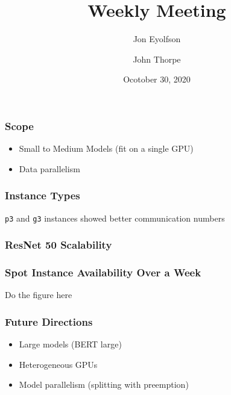 

\title{Weekly Meeting}
\date{Ocotober 30, 2020}
\author{Jon Eyolfson \and John Thorpe}



  \begin{frame}[plain]
    \titlepage
  \end{frame}

  \setcounter{framenumber}{0}

  \begin{frame}
    \frametitle{Scope}

    \begin{itemize}
      \item Small to Medium Models (fit on a single GPU)
      \item Data parallelism
    \end{itemize}
  \end{frame}

  \begin{frame}
    \frametitle{Instance Types}

    \texttt{p3} and \texttt{g3} instances showed better communication numbers

  \end{frame}

  \begin{frame}
    \frametitle{ResNet 50 Scalability}

  \end{frame}

  \begin{frame}
    \frametitle{Spot Instance Availability Over a Week}

    Do the figure here
  \end{frame}

  \begin{frame}
    \frametitle{Future Directions}

    \begin{itemize}
      \item Large models (BERT large)
      \item Heterogeneous GPUs
      \item Model parallelism (splitting with preemption)
    \end{itemize}
  \end{frame}


